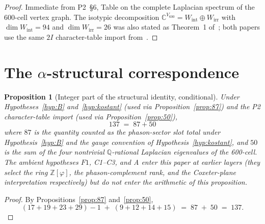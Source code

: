 \documentclass[12pt]{article}
\newtheorem{proposition}[theorem]{Proposition}
\theoremstyle{definition}
\theoremstyle{remark}
\newcommand{\C}{\mathbb{C}}
\newcommand{\Q}{\mathbb{Q}}
\newcommand{\Zphi}{\mathbb{Z}[\varphi]}
\begin{document}
\begin{proof}
Immediate from P2~\S 6, Table on the complete Laplacian spectrum of the $600$-cell vertex graph. The isotypic decomposition $\C^{V_{600}} = W_{\mathrm{int}} \oplus W_{\mathrm{irr}}$ with $\dim W_{\mathrm{int}} = 94$ and $\dim W_{\mathrm{irr}} = 26$ was also stated as Theorem~1 of~\citet{SmartXXII}; both papers use the same $2I$ character-table import from~\citep{DuVal1964}.
\end{proof}

\section{The $\alpha$-structural correspondence}\label{sec:theorem}

\begin{proposition}[Integer part of the structural identity, conditional]\label{thm:alpha}
Under Hypotheses~\ref{hyp:B} and~\ref{hyp:kostant} (used via Proposition~\ref{prop:87}) and the P2 character-table import (used via Proposition~\ref{prop:50}),
\begin{equation}
  137 \;=\; 87 + 50
\end{equation}
where $87$ is the quantity counted as the phason-sector slot total under Hypothesis~\ref{hyp:B} and the gauge convention of Hypothesis~\ref{hyp:kostant}, and $50$ is the sum of the four nontrivial $\Q$-rational Laplacian eigenvalues of the 600-cell. The ambient hypotheses $F1$, C1--C3, and A enter this paper at earlier layers (they select the ring $\Zphi$, the phason-complement rank, and the Coxeter-plane interpretation respectively) but do not enter the arithmetic of this proposition.
\end{proposition}

\begin{proof}
By Propositions~\ref{prop:87} and~\ref{prop:50},
\[
  (17 + 19 + 23 + 29) - 1 \;+\; (9 + 12 + 14 + 15) \;=\; 87 \;+\; 50 \;=\; 137.
\]
\end{proof}
\end{document}
